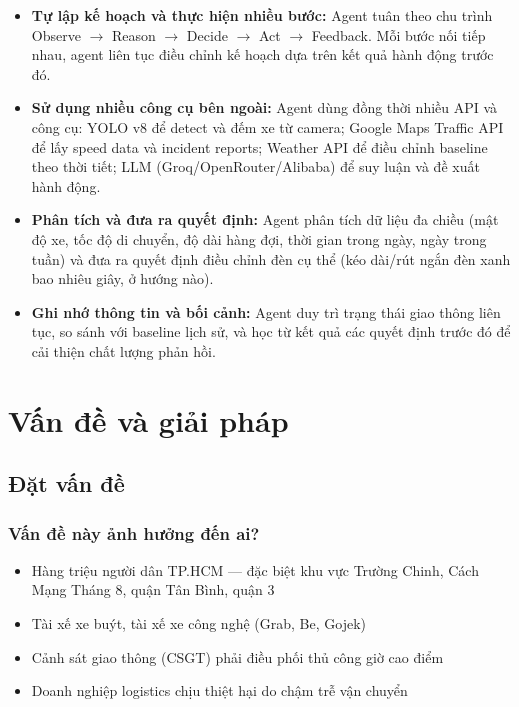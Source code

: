\documentclass[12pt,a4paper]{article}
\begin{document}
\begin{itemize}
    \item \textbf{Tự lập kế hoạch và thực hiện nhiều bước:} Agent tuân theo chu trình Observe $\rightarrow$ Reason $\rightarrow$ Decide $\rightarrow$ Act $\rightarrow$ Feedback. Mỗi bước nối tiếp nhau, agent liên tục điều chỉnh kế hoạch dựa trên kết quả hành động trước đó.

    \item \textbf{Sử dụng nhiều công cụ bên ngoài:} Agent dùng đồng thời nhiều API và công cụ: YOLO v8 để detect và đếm xe từ camera; Google Maps Traffic API để lấy speed data và incident reports; Weather API để điều chỉnh baseline theo thời tiết; LLM (Groq/OpenRouter/Alibaba) để suy luận và đề xuất hành động.

    \item \textbf{Phân tích và đưa ra quyết định:} Agent phân tích dữ liệu đa chiều (mật độ xe, tốc độ di chuyển, độ dài hàng đợi, thời gian trong ngày, ngày trong tuần) và đưa ra quyết định điều chỉnh đèn cụ thể (kéo dài/rút ngắn đèn xanh bao nhiêu giây, ở hướng nào).

    \item \textbf{Ghi nhớ thông tin và bối cảnh:} Agent duy trì trạng thái giao thông liên tục, so sánh với baseline lịch sử, và học từ kết quả các quyết định trước đó để cải thiện chất lượng phản hồi.
\end{itemize}

\section{Vấn đề và giải pháp}

\subsection{Đặt vấn đề}

\subsubsection{Vấn đề này ảnh hưởng đến ai?}

\begin{itemize}
    \item Hàng triệu người dân TP.HCM — đặc biệt khu vực Trường Chinh, Cách Mạng Tháng 8, quận Tân Bình, quận 3
    \item Tài xế xe buýt, tài xế xe công nghệ (Grab, Be, Gojek)
    \item Cảnh sát giao thông (CSGT) phải điều phối thủ công giờ cao điểm
    \item Doanh nghiệp logistics chịu thiệt hại do chậm trễ vận chuyển
\end{itemize}
\end{document}
